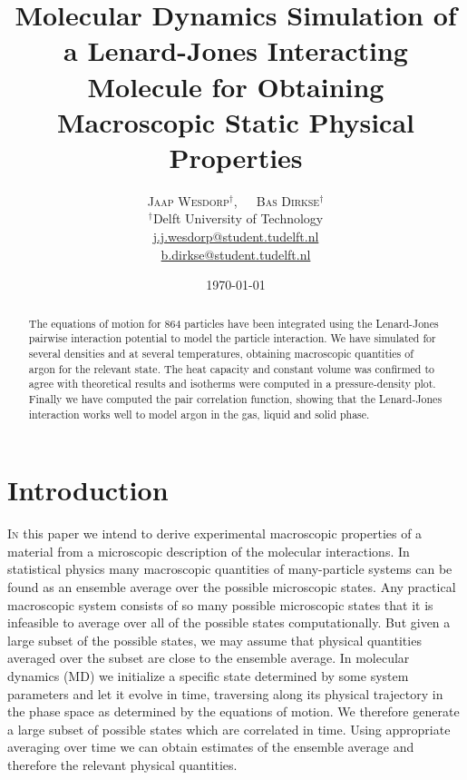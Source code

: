 \documentclass[twoside]{article}
\title{\vspace{-15mm}\fontsize{18pt}{10pt}\selectfont\textbf{Molecular Dynamics Simulation of a Lenard-Jones Interacting Molecule for Obtaining Macroscopic Static Physical Properties}} %
\author{
	\large
	\textsc{Jaap Wesdorp}$^\dagger$, $\hspace{10pt}$ \textsc{Bas Dirkse}$^\dagger$ \\ %
	\normalsize $^\dagger$Delft University of Technology \\ %
	\normalsize \href{mailto:j.j.wesdorp@student.tudelft.nl}{j.j.wesdorp@student.tudelft.nl} \\
	\normalsize \href{mailto:b.dirkse@student.tudelft.nl}{b.dirkse@student.tudelft.nl} 
}
\date{\today\vspace{-8mm}}
\begin{document}


\maketitle %
\thispagestyle{firststyle} %


\begin{abstract}
\noindent  
The equations of motion for 864 particles have been integrated using the Lenard-Jones pairwise interaction potential to model the particle interaction. We have simulated for several densities and at several temperatures, obtaining macroscopic quantities of argon for the relevant state. The heat capacity and constant volume was confirmed to agree with theoretical results and isotherms were computed in a pressure-density plot. Finally we have computed the pair correlation function, showing that the Lenard-Jones interaction works well to model argon in the gas, liquid and solid phase.

	
\end{abstract}


\section{Introduction}

\lettrine[nindent=1em,lines=2]{I}
n this paper we intend to derive experimental macroscopic properties of a material from a microscopic description of the molecular interactions. In statistical physics many macroscopic quantities of many-particle systems can be found as an ensemble average over the possible microscopic states. Any practical macroscopic system consists of so many possible microscopic states that it is infeasible to average over all of the possible states computationally. But given a large subset of the possible states, we may assume that physical quantities averaged over the subset are close to the ensemble average. In molecular dynamics (MD) we initialize a specific state determined by some system parameters and let it evolve in time, traversing along its physical trajectory in the phase space as determined by the equations of motion. We therefore generate a large subset of possible states which are correlated in time. Using appropriate averaging over time we can obtain estimates of the ensemble average and therefore the relevant physical quantities.
\end{document}
